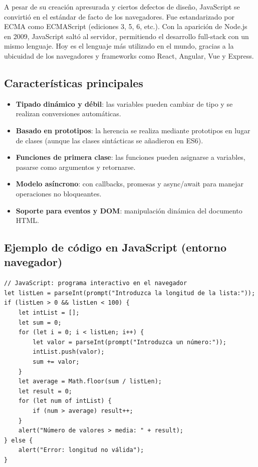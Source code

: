 A pesar de su creación apresurada y ciertos defectos de diseño, JavaScript se convirtió en el estándar de facto de los navegadores. Fue estandarizado por ECMA como ECMAScript (ediciones 3, 5, 6, etc.). Con la aparición de Node.js en 2009, JavaScript saltó al servidor, permitiendo el desarrollo full-stack con un mismo lenguaje. Hoy es el lenguaje más utilizado en el mundo, gracias a la ubicuidad de los navegadores y frameworks como React, Angular, Vue y Express.

\subsection{Características principales}

\begin{itemize}
  \item \textbf{Tipado dinámico y débil}: las variables pueden cambiar de tipo y se realizan conversiones automáticas.
  \item \textbf{Basado en prototipos}: la herencia se realiza mediante prototipos en lugar de clases (aunque las clases sintácticas se añadieron en ES6).
  \item \textbf{Funciones de primera clase}: las funciones pueden asignarse a variables, pasarse como argumentos y retornarse.
  \item \textbf{Modelo asíncrono}: con callbacks, promesas y async/await para manejar operaciones no bloqueantes.
  \item \textbf{Soporte para eventos y DOM}: manipulación dinámica del documento HTML.
\end{itemize}

\subsection{Ejemplo de código en JavaScript (entorno navegador)}

\begin{verbatim}
// JavaScript: programa interactivo en el navegador
let listLen = parseInt(prompt("Introduzca la longitud de la lista:"));
if (listLen > 0 && listLen < 100) {
    let intList = [];
    let sum = 0;
    for (let i = 0; i < listLen; i++) {
        let valor = parseInt(prompt("Introduzca un número:"));
        intList.push(valor);
        sum += valor;
    }
    let average = Math.floor(sum / listLen);
    let result = 0;
    for (let num of intList) {
        if (num > average) result++;
    }
    alert("Número de valores > media: " + result);
} else {
    alert("Error: longitud no válida");
}
\end{verbatim}

